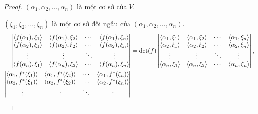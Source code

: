\documentclass[class=linearalgebra,crop=false]{standalone}
\begin{document}
\begin{proof}
    \par $(\alpha_{1}, \alpha_{2}, \ldots, \alpha_{n})$ là một cơ sở của $V$.
    \par $(\xi_{1}, \xi_{2}, \ldots, \xi_{n})$ là một cơ sở đối ngẫu của $(\alpha_{1}, \alpha_{2}, \ldots, \alpha_{n})$.
    \begingroup
    \allowdisplaybreaks
    \begin{align*}
        \begin{vmatrix}
            \left\langle{f(\alpha_{1}),\xi_{1}}\right\rangle & \left\langle{f(\alpha_{1}),\xi_{2}}\right\rangle & \cdots & \left\langle{f(\alpha_{1}),\xi_{n}}\right\rangle \\
            \left\langle{f(\alpha_{2}),\xi_{1}}\right\rangle & \left\langle{f(\alpha_{2}),\xi_{2}}\right\rangle & \cdots & \left\langle{f(\alpha_{2}),\xi_{n}}\right\rangle \\
            \vdots                          & \vdots                          & \ddots & \vdots                          \\
            \left\langle{f(\alpha_{n}),\xi_{1}}\right\rangle & \left\langle{f(\alpha_{n}),\xi_{2}}\right\rangle & \cdots & \left\langle{f(\alpha_{n}),\xi_{n}}\right\rangle \\
        \end{vmatrix}
         & = \det(f)
        \begin{vmatrix}
            \left\langle{\alpha_{1},\xi_{1}}\right\rangle & \left\langle{\alpha_{1},\xi_{2}}\right\rangle & \cdots & \left\langle{\alpha_{1},\xi_{n}}\right\rangle \\
            \left\langle{\alpha_{2},\xi_{1}}\right\rangle & \left\langle{\alpha_{2},\xi_{2}}\right\rangle & \cdots & \left\langle{\alpha_{2},\xi_{n}}\right\rangle \\
            \vdots                       & \vdots                       & \ddots & \vdots                       \\
            \left\langle{\alpha_{n},\xi_{1}}\right\rangle & \left\langle{\alpha_{n},\xi_{2}}\right\rangle & \cdots & \left\langle{\alpha_{n},\xi_{n}}\right\rangle \\
        \end{vmatrix}, \\
        \begin{vmatrix}
            \left\langle{\alpha_{1},f^{*}(\xi_{1})}\right\rangle & \left\langle{\alpha_{1},f^{*}(\xi_{2})}\right\rangle & \cdots & \left\langle{\alpha_{1},f^{*}(\xi_{n})}\right\rangle \\
            \left\langle{\alpha_{2},f^{*}(\xi_{1})}\right\rangle & \left\langle{\alpha_{2},f^{*}(\xi_{2})}\right\rangle & \cdots & \left\langle{\alpha_{2},f^{*}(\xi_{n})}\right\rangle \\
            \vdots                              & \vdots                              & \ddots & \vdots                              \\

\end{vmatrix}
\end{align*}
\end{proof}
\end{document}
